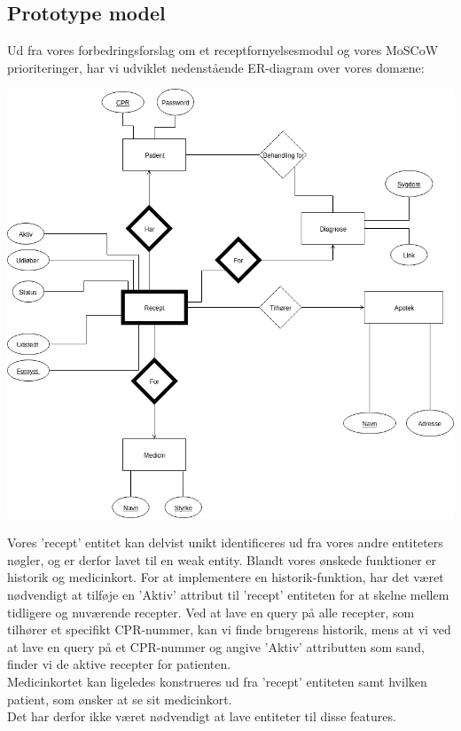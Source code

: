 \subsection{Prototype model}
Ud fra vores forbedringsforslag om et receptfornyelsesmodul og vores MoSCoW prioriteringer, har vi udviklet nedenstående ER-diagram over vores domæne:\\
\begin{center}
	\includegraphics[scale=0.48]{Materials/Prototype/NewERDiagram}
\end{center}
Vores 'recept' entitet kan delvist unikt identificeres ud fra vores andre entiteters nøgler, og er derfor lavet til en weak entity.
Blandt vores ønskede funktioner er historik og medicinkort. For at implementere en historik-funktion, har det været nødvendigt at tilføje en 'Aktiv' attribut til 'recept' entiteten for at skelne mellem tidligere og nuværende recepter. Ved at lave en query på alle recepter, som tilhører et specifikt CPR-nummer, kan vi finde brugerens historik, mens at vi ved at lave en query på et CPR-nummer og angive 'Aktiv' attributten som sand, finder vi de aktive recepter for patienten.\\
Medicinkortet kan ligeledes konstrueres ud fra 'recept' entiteten samt hvilken patient, som ønsker at se sit medicinkort.\\ 
Det har derfor ikke været nødvendigt at lave entiteter til disse features.\\

